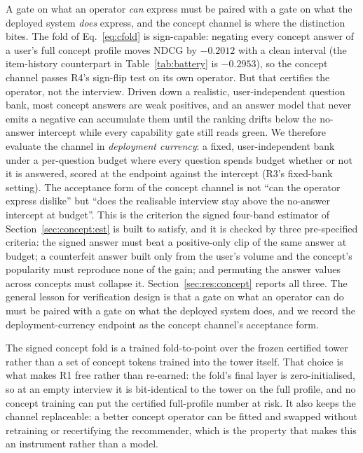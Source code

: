 \documentclass[manuscript,screen]{acmart}
\begin{document}
A gate on what an operator \emph{can} express must be paired with a gate on what the deployed system \emph{does} express, and the concept channel is where the distinction bites. The fold of Eq.~\eqref{eq:cfold} is sign-capable: negating every concept answer of a user's full concept profile moves NDCG by $-0.2012$ with a clean interval (the item-history counterpart in Table~\ref{tab:battery} is $-0.2953$), so the concept channel passes R4's sign-flip test on its own operator. But that certifies the operator, not the interview. Driven down a realistic, user-independent question bank, most concept answers are weak positives, and an answer model that never emits a negative can accumulate them until the ranking drifts below the no-answer intercept while every capability gate still reads green. We therefore evaluate the channel in \emph{deployment currency}: a fixed, user-independent bank under a per-question budget where every question spends budget whether or not it is answered, scored at the endpoint against the intercept (R3's fixed-bank setting). The acceptance form of the concept channel is not ``can the operator express dislike'' but ``does the realisable interview stay above the no-answer intercept at budget''. This is the criterion the signed four-band estimator of Section~\ref{sec:concept:est} is built to satisfy, and it is checked by three pre-specified criteria: the signed answer must beat a positive-only clip of the same answer at budget; a counterfeit answer built only from the user's volume and the concept's popularity must reproduce none of the gain; and permuting the answer values across concepts must collapse it. Section~\ref{sec:res:concept} reports all three. The general lesson for verification design is that a gate on what an operator can do must be paired with a gate on what the deployed system does, and we record the deployment-currency endpoint as the concept channel's acceptance form.

The signed concept fold is a trained fold-to-point over the frozen certified tower rather than a set of concept tokens trained into the tower itself. That choice is what makes R1 free rather than re-earned: the fold's final layer is zero-initialised, so at an empty interview it is bit-identical to the tower on the full profile, and no concept training can put the certified full-profile number at risk. It also keeps the channel replaceable: a better concept operator can be fitted and swapped without retraining or recertifying the recommender, which is the property that makes this an instrument rather than a model.
\end{document}

